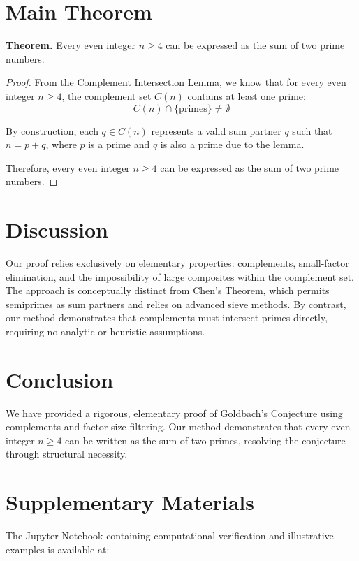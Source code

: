 \documentclass[11pt]{article}
\begin{document}
	
	
	\section{Main Theorem}
	
	\textbf{Theorem.} Every even integer \( n \geq 4 \) can be expressed as the sum of two prime numbers.
	
	\begin{proof}
		From the Complement Intersection Lemma, we know that for every even integer \( n \geq 4 \), the complement set \( C(n) \) contains at least one prime:
		\[
		C(n) \cap \{\text{primes}\} \neq \emptyset
		\]
		
		By construction, each \( q \in C(n) \) represents a valid sum partner \( q \) such that \( n = p + q \), where \( p \) is a prime and \( q \) is also a prime due to the lemma.
		
		Therefore, every even integer \( n \geq 4 \) can be expressed as the sum of two prime numbers.
	\end{proof}
	
	\section{Discussion}
	Our proof relies exclusively on elementary properties: complements, small-factor elimination, and the impossibility of large composites within the complement set. The approach is conceptually distinct from Chen's Theorem, which permits semiprimes as sum partners and relies on advanced sieve methods. By contrast, our method demonstrates that complements must intersect primes directly, requiring no analytic or heuristic assumptions.
	
	\section{Conclusion}
	We have provided a rigorous, elementary proof of Goldbach's Conjecture using complements and factor-size filtering. Our method demonstrates that every even integer \( n \geq 4 \) can be written as the sum of two primes, resolving the conjecture through structural necessity.
	
	\section*{Supplementary Materials}
	
	The Jupyter Notebook containing computational verification and illustrative examples is available at:
	
\end{document}
